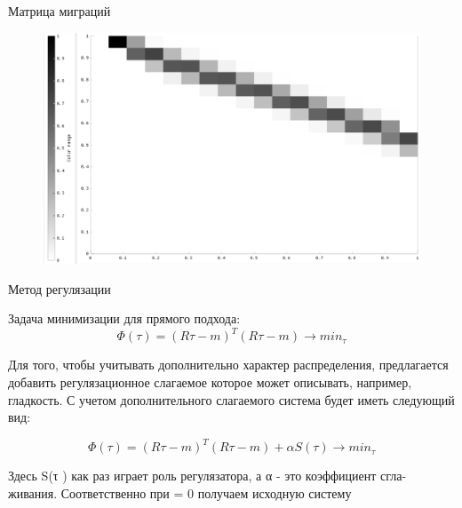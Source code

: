\documentclass[fullscreen=true,russian,compress,%
	hyperref={unicode,bookmarks=false}]{presentation}
\begin{document}
\begin{frame}{Матрица миграций}
\begin{figure}[!ht]
   \includegraphics[width=\linewidth]{images/gaus_mig_black.png}
\end{figure}
\end{frame}




\begin{frame}{Метод регулязации}
\begin{block}{}
   Задача минимизации для прямого подхода:
   \begin{equation}
      \Phi(\tau)=(R\tau-m)^T (R\tau-m) \to min_{\tau}
      \label{min_base}
   \end{equation}
\end{block}
\begin{block}{}
   Для того, чтобы учитывать дополнительно характер распределения, предлагается добавить регулязационное слагаемое  
   которое может описывать, например, гладкость. С учетом дополнительного слагаемого система будет иметь следующий вид: 

   \begin{equation}
      \Phi(\tau)=(R\tau-m)^T (R\tau-m) + \alpha S(\tau) \to min_{\tau}
      \label{min_svd}
   \end{equation}

   Здесь S(τ ) как раз играет роль регулязатора, а α - это коэффициент сгла-
   живания. Соответственно при \alpha = 0 получаем исходную систему
\end{block}
\end{frame}


\end{document}
